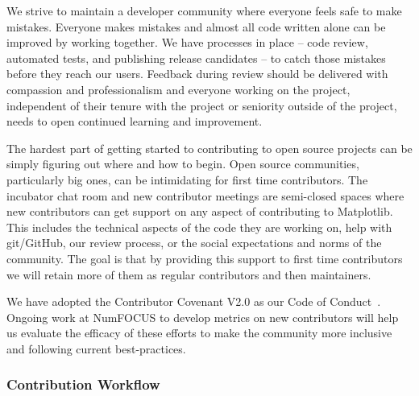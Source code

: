 \documentclass[12pt]{article}
\numberwithin{page}{section}
\begin{document}

We strive to maintain a developer community where everyone feels safe to make
mistakes. Everyone makes mistakes and almost all code written alone can be
improved by working together.  We have processes in place -- code review,
automated tests, and publishing release candidates -- to catch those mistakes
before they reach our users.  Feedback during review should be delivered with
compassion and professionalism and everyone working on the project, independent
of their tenure with the project or seniority outside of the project, needs to
open continued learning and improvement.

The hardest part of getting started to contributing to open source
projects can be simply figuring out where and how to begin.  Open source communities,
particularly big ones, can be intimidating for first time
contributors.  The incubator chat room and new contributor meetings
are semi-closed spaces where  new
contributors can get support on any aspect of contributing to
Matplotlib.  This includes the technical aspects of the code they are
working on, help with git/GitHub, our review process, or the social
expectations and norms of the community.  The goal is that by
providing this support to first time contributors we will retain more
of them as regular contributors and then maintainers.


We have adopted the Contributor Covenant V2.0 as our Code of
Conduct~\cite{CoC}.  Ongoing work at NumFOCUS to develop metrics on new
contributors will help us evaluate the efficacy of these efforts to make the
community more inclusive and following current best-practices.

\subsubsection{Contribution Workflow}
\end{document}
